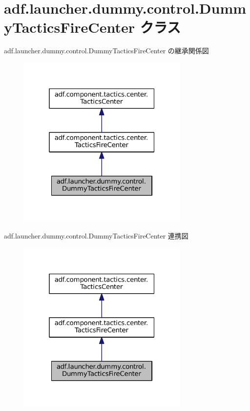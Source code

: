 \hypertarget{classadf_1_1launcher_1_1dummy_1_1control_1_1DummyTacticsFireCenter}{}\section{adf.\+launcher.\+dummy.\+control.\+Dummy\+Tactics\+Fire\+Center クラス}
\label{classadf_1_1launcher_1_1dummy_1_1control_1_1DummyTacticsFireCenter}


adf.\+launcher.\+dummy.\+control.\+Dummy\+Tactics\+Fire\+Center の継承関係図
\nopagebreak
\begin{figure}[H]
\begin{center}
\leavevmode
\includegraphics[width=241pt]{classadf_1_1launcher_1_1dummy_1_1control_1_1DummyTacticsFireCenter__inherit__graph}
\end{center}
\end{figure}


adf.\+launcher.\+dummy.\+control.\+Dummy\+Tactics\+Fire\+Center 連携図
\nopagebreak
\begin{figure}[H]
\begin{center}
\leavevmode
\includegraphics[width=241pt]{classadf_1_1launcher_1_1dummy_1_1control_1_1DummyTacticsFireCenter__coll__graph}
\end{center}
\end{figure}
